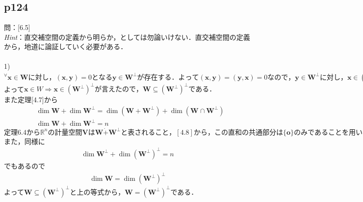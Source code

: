 \documentclass[dvipdfmx,uplatex,11pt]{jsarticle}
\theoremstyle{definition}
\begin{document}
\subsection{p124}
\noindent
問：[6.5]\\
\textsl{Hint}：直交補空間の定義から明らか，としては勿論いけない．直交補空間の定義から，地道に論証していく必要がある．\\ 
\dotfill \\
1)$^{\forall}\bm{x} \in \bm{W}に対し，(\bm{x},\bm{y})=0となる\bm{y} \in \bm{W}^{\perp}が存在する．よって(\bm{x},\bm{y})=(\bm{y},\bm{x})=0なので，\bm{y} \in \bm{W}^{\perp}に対し，\bm{x} \in (\bm{W}^{\perp})^{\perp}である．$\\
よって$\bm{x} \in W \Longrightarrow \bm{x} \in  (\bm{W}^{\perp})^{\perp}が言えたので，\bm{W} \subseteq  (\bm{W}^{\perp})^{\perp}である．$\\
また定理[4.7]から
\begin{eqnarray*}
& \dim \bm{W} +\dim \bm{W}^{\perp} =\dim (\bm{W} +\bm{W}^{\perp} )+\dim (\bm{W} \cap \bm{W}^{\perp} ) \\
& \dim \bm{W} +\dim \bm{W}^{\perp} =n
\end{eqnarray*}
$定理6.4から\mathbb{R}^nの計量空間\bm{V}は\bm{W}\dot{+}\bm{W}^{\perp}と表されること，[4.8]から，この直和の共通部分は\{ \bm{o} \}のみであることを用いた．$\\
また，同様に
\begin{eqnarray*}
\dim \bm{W}^{\perp} +\dim (\bm{W}^{\perp})^{\perp} =n
\end{eqnarray*}
でもあるので
\begin{eqnarray*}
\dim \bm{W} =\dim (\bm{W}^{\perp})^{\perp}
\end{eqnarray*}
よって$\bm{W} \subseteq  (\bm{W}^{\perp})^{\perp}と上の等式から，\bm{W} =  (\bm{W}^{\perp})^{\perp}$である．
%
%
%
\newpage
%
%
%
\end{document}
